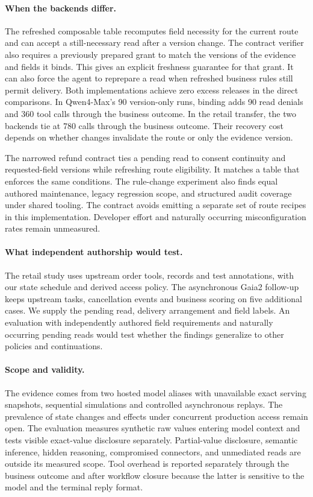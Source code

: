 \documentclass[10pt,twocolumn]{article}
\begin{document}
\paragraph{When the backends differ.}
The refreshed composable table recomputes field necessity for the current route and can accept a still-necessary read after a version change. The contract verifier also requires a previously prepared grant to match the versions of the evidence and fields it binds. This gives an explicit freshness guarantee for that grant. It can also force the agent to reprepare a read when refreshed business rules still permit delivery. Both implementations achieve zero excess releases in the direct comparisons. In Qwen4-Max's 90 version-only runs, binding adds 90 read denials and 360 tool calls through the business outcome. In the retail transfer, the two backends tie at 780 calls through the business outcome. Their recovery cost depends on whether changes invalidate the route or only the evidence version.

The narrowed refund contract ties a pending read to consent continuity and requested-field versions while refreshing route eligibility. It matches a table that enforces the same conditions. The rule-change experiment also finds equal authored maintenance, legacy regression scope, and structured audit coverage under shared tooling. The contract avoids emitting a separate set of route recipes in this implementation. Developer effort and naturally occurring misconfiguration rates remain unmeasured.

\paragraph{What independent authorship would test.}
The retail study uses upstream order tools, records and test annotations, with our state schedule and derived access policy. The asynchronous Gaia2 follow-up keeps upstream tasks, cancellation events and business scoring on five additional cases. We supply the pending read, delivery arrangement and field labels. An evaluation with independently authored field requirements and naturally occurring pending reads would test whether the findings generalize to other policies and continuations.

\paragraph{Scope and validity.}
The evidence comes from two hosted model aliases with unavailable exact serving snapshots, sequential simulations and controlled asynchronous replays. The prevalence of state changes and effects under concurrent production access remain open. The evaluation measures synthetic raw values entering model context and tests visible exact-value disclosure separately. Partial-value disclosure, semantic inference, hidden reasoning, compromised connectors, and unmediated reads are outside its measured scope. Tool overhead is reported separately through the business outcome and after workflow closure because the latter is sensitive to the model and the terminal reply format.
\end{document}
